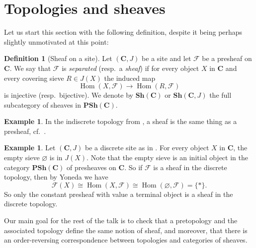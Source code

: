 \documentclass[12pt,reqno,a4paper]{amsart}
\theoremstyle{plain}
\theoremstyle{definition}
\newtheorem{defn}[thm]{Definition}
\newtheorem{exmp}[thm]{Example}
\theoremstyle{remark}
\begin{document}
\section{Topologies and sheaves}

Let us start this section with the following definition, despite it being perhaps slightly unmotivated at this point:

\begin{defn}[Sheaf on a site]
  Let $(\mathbf{C},J)$ be a site and let $\mathscr{F}$ be a presheaf on $\mathbf{C}$.
  We say that $\mathscr{F}$ is \textit{separated} (resp.~a \textit{sheaf}) if for every object $X$ in $\mathbf{C}$ and every covering sieve $R \in J(X)$ the induced map
  \[ \operatorname{Hom}(X,\mathscr{F}) \to \operatorname{Hom}(R,\mathscr{F}) \]
  is injective (resp.~bijective).
  We denote by $\mathbf{Sh}(\mathbf{C})$ or $\mathbf{Sh}(\mathbf{C},J)$ the full subcategory of sheaves in $\mathbf{PSh}(\mathbf{C})$.
\end{defn}

\begin{exmp}\label{exmp:indiscretesheaf}
  In the indiscrete topology from , a sheaf is the same thing as a presheaf, cf.~.
\end{exmp}

\begin{exmp}\label{exmp:discretesheaf}
  Let $(\mathbf{C},J)$ be a discrete site as in .
  For every object $X$ in $\mathbf{C}$, the empty sieve $\varnothing$ is in $J(X)$.
  Note that the empty sieve is an initial object in the category $\mathbf{PSh}(\mathbf{C})$ of presheaves on $\mathbf{C}$.
  So if $\mathscr{F}$ is a sheaf in the discrete topology, then by Yoneda we have
  \[ \mathscr{F}(X) \cong \operatorname{Hom}(X,\mathscr{F}) \cong \operatorname{Hom}(\varnothing, \mathscr{F}) = \{ * \}. \]
  So only the constant presheaf with value a terminal object is a sheaf in the discrete topology.
\end{exmp}

Our main goal for the rest of the talk is to check that a pretopology and the associated topology define the same notion of sheaf, and moreover, that there is an order-reversing correspondence between topologies and categories of sheaves.
\end{document}
